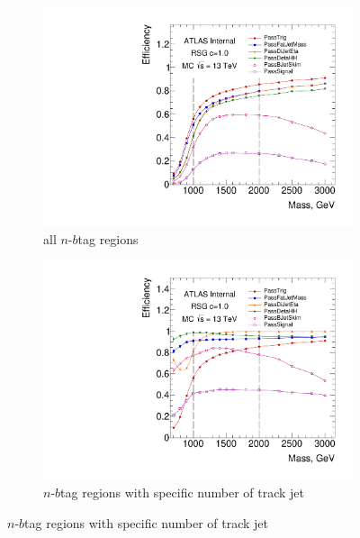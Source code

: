\begin{figure}[htbp!]
    \captionsetup{justification=centering}
    \begin{subfigure}[b]{0.45\textwidth}
        \includegraphics[width=\textwidth,angle=-90]{figures/boosted/SigEff/evtsel_Moriond_Efficiency_PreSel.pdf}
        \caption{all $n$-$b$tag regions}
        \label{fig:boosted-selection-efficiency-abs}
    \end{subfigure}
    \quad
    \begin{subfigure}[b]{0.45\textwidth}
        \includegraphics[width=\textwidth,angle=-90]{figures/boosted/SigEff/evtsel_Moriond_Efficiency_PreSel_rel.pdf}
        \caption{$n$-$b$tag regions with specific number of track jet}
        \label{fig:boosted-selection-efficiency-rel}
    \end{subfigure}

\end{figure}
